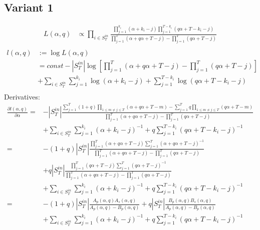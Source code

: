 \documentclass[a4paper, 12pt]{article}
\newcommand{\sint}{|S^{in}_T|}
\begin{document}
\subsection{Variant 1}
\begin{align*}
    L(\alpha, q) &\propto \prod_{i \in S_T^{in}} \frac{\prod_{j=1}^{k_i} (\alpha + k_i - j)\prod_{j=1}^{T - k_i} (q\alpha + T - k_i - j)}{\prod_{j=1}^T(\alpha + q\alpha + T - j) - \prod_{j=1}^T (q\alpha + T - j)} \\
\end{align*}
\begin{align} \label{eq:4}
    l(\alpha, q) &:= \log L(\alpha, q) \nonumber \\
    &= const - |S_T^{in}|\log\left[\prod_{j=1}^T(\alpha + q\alpha + T - j) - \prod_{j=1}^T (q\alpha + T - j)\right] \nonumber \\
    &+ \sum_{i \in S_T^{in}} \sum_{j = 1}^{k_i} \log(\alpha + k_i - j) + \sum_{j = 1}^{T - k_i} \log(q\alpha + T - k_i - j) \nonumber \\
\end{align}
Derivatives:
\begin{align} \label{eq:5}
    \frac{\partial l(\alpha, q)}{\partial \alpha} =& -\sint \frac{\sum_{j = 1}^{T} (1 + q) \prod_{1 \leq m \neq j \leq T} (\alpha + q\alpha + T - m) - \sum_{j = 1}^{T} q \prod_{1 \leq m \neq j \leq T} (q\alpha + T - m)}{\prod_{j = 1}^{T} (\alpha + q\alpha + T - j) - \prod_{j=1}^T (q\alpha + T - j)}\nonumber \\
    &+ \sum_{i \in S_T^{in}} \sum_{j = 1}^{k_i} (\alpha + k_i - j)^{-1} + q\sum_{j = 1}^{T - k_i} (q\alpha + T - k_i - j)^{-1} \nonumber \\
    =& -(1 + q)\sint \frac{ \prod_{j = 1}^{T} (\alpha + q\alpha + T - j) \sum_{j = 1}^{T} (\alpha + q\alpha + T - j)^{-1} }{\prod_{j = 1}^{T} (\alpha + q\alpha + T - j) - \prod_{j=1}^T (q\alpha + T - j)} \nonumber \\
    &+ q|S_T^{in}| \frac{\prod_{j = 1}^{T} (q\alpha + T - j) \sum_{j = 1}^{T} (q\alpha + T - j)^{-1}  }{ \prod_{j = 1}^{T} (\alpha + q\alpha + T - j) - \prod_{j=1}^T (q\alpha + T - j)} \nonumber \\
    &+ \sum_{i \in S_T^{in}} \sum_{j = 1}^{k_i} (\alpha + k_i - j)^{-1} + q\sum_{j = 1}^{T - k_i} (q\alpha + T - k_i - j)^{-1} \nonumber \\
    =& -(1 + q)\sint \frac{ A_p(\alpha, q) A_s(\alpha, q) }{A_p(\alpha, q) - B_p(\alpha, q)} + q|S_T^{in}| \frac{B_p(\alpha, q) B_s(\alpha, q)  }{ A_p(\alpha, q) - B_p(\alpha, q)} \nonumber \\
    &+ \sum_{i \in S_T^{in}} \sum_{j = 1}^{k_i} (\alpha + k_i - j)^{-1} + q\sum_{j = 1}^{T - k_i} (q\alpha + T - k_i - j)^{-1} \nonumber \\
\end{align}
\end{document}
